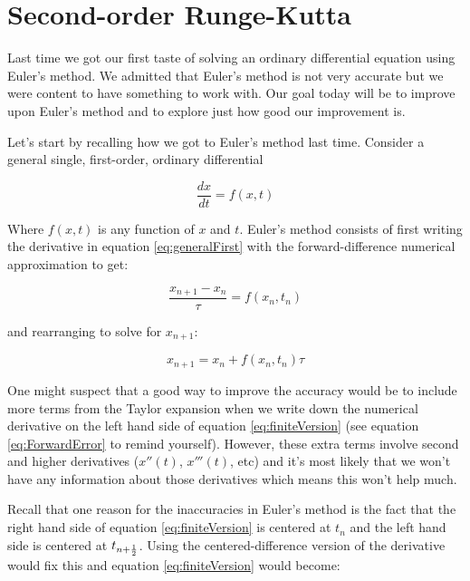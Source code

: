 \chapter{Second-order Runge-Kutta}
\label{Lab:2}

  
Last time we got our first taste of solving an ordinary differential
equation using Euler's method.  We admitted that Euler's method is not
very accurate but we were content to have something to work with.  Our goal today will
be to improve upon Euler's method and to explore just how good our
improvement is.



Let's start by recalling how we got to Euler's method last time.
Consider a general single, first-order, ordinary differential

\begin{equation}\label{eq:generalFirst}
\frac{dx}{dt} = f(x,t)
\end{equation}

Where $f(x,t)$ is any function of $x$ and $t$.  Euler's method
consists of first writing the derivative in equation
\eqref{eq:generalFirst} with the forward-difference numerical
approximation to get:

\begin{equation}\label{eq:finiteVersion}
\frac{x_{n+1} - x_n}{\tau} = f(x_n,t_n)
\end{equation}

and rearranging to solve for $x_{n+1}$:

\begin{equation}
x_{n+1} = x_n + f(x_n,t_n) \tau
\end{equation}

One might suspect that a good way to improve the accuracy would be to
include more terms from the Taylor expansion when we write down the
numerical derivative on the left hand side of equation
\eqref{eq:finiteVersion} (see equation \eqref{eq:ForwardError} to
remind yourself).  However, these extra terms involve second and higher
derivatives ($x''(t)$, $x'''(t)$, etc) and it's most likely that we
won't have any information about those derivatives which means this
won't help much.

Recall that one reason for the inaccuracies in Euler's method is the
fact that the right hand side of equation \eqref{eq:finiteVersion} is
centered at $t_n$ and the left hand side is centered at $t_{n+{1\over
    2}}$.  Using the centered-difference version of the derivative
would fix this and equation \eqref{eq:finiteVersion} would become:

